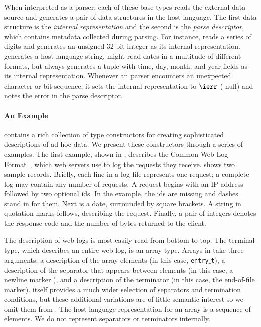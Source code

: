 When interpreted as a parser, each of these base types reads
the external data source and generates a pair of data structures
in the host language.  The first data structure is the
{\em internal representation}  and
the second is the {\em parse descriptor}, which contains metadata collected during parsing.
For instance, \Puint{} reads a series of digits and generates an unsigned 32-bit integer as its
internal representation.  \Pstring{} generates a 
host-language string.  
\Pdate{} might read dates in a multitude of
different formats, but always generates a tuple
with time, day, month, and year fields as its internal 
representation.  Whenever an \ipads{} parser encounters
an unexpected character or bit-sequence, it sets the internal representation to
$\ierr$ (\ie{} null) and notes the error in the
parse descriptor.

\paragraph*{An \ipads{} Example}
\ipads{} contains a rich collection of type constructors for creating
sophisticated descriptions of ad hoc data.  We present these
constructors through a series of examples.  The first example, shown
in , describes the Common Web
Log Format~\cite{wpp}, which web servers use to log the requests they
receive.   shows two sample
records.  Briefly, each line in a log file represents one request;
a complete log may contain any number of requests.  A request begins
with an IP address followed by two optional ids.  In the
example, the ids are missing and dashes stand in for them.  Next is a date,
surrounded by square brackets.  A string in
quotation marks follows, describing the request.  Finally,
a pair of integers denotes the response code and the
number of bytes returned to the client.

The \ipads{} description of web logs is most easily read from bottom to top.
The terminal type, which describes an entire web log, is an array type.
Arrays in \ipads{} take three arguments: a description
of the array elements (in this case, {\tt entry$\_$t}),
a description of the separator that appears between elements
(in this case, a newline marker \Peor{}), and 
a description of the terminator (in this case, the end-of-file marker).
\padsc{} itself provides a much wider selection of separators and
termination conditions, but these additional variations are of little semantic 
interest so we omit them from \ipads.  
The host language representation for 
an array is a sequence of elements. We do not represent separators or terminators internally.

